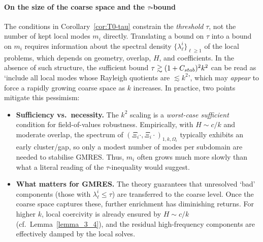\documentclass[preprint,3p,times]{elsarticle}
\newcommand{\Cstab}{C_{\textup{\textsf{stab}}}}
\theoremstyle{definition}
\numberwithin{equation}{section}
\begin{document}
\paragraph{On the size of the coarse space and the $\tau$-bound}
The conditions in Corollary~\ref{cor:T0-tau} constrain the \emph{threshold} $\tau$, not the number of kept local modes $m_i$ directly. 
Translating a bound on $\tau$ into a bound on $m_i$ requires information about the spectral density
$\{\lambda_\ell^i\}_{\ell\ge1}$ of the local problems, which depends on geometry, overlap, $H$, and coefficients. 
In the absence of such structure, the sufficient bound $\tau \gtrsim (1+\Cstab)^2 k^2$
can be read as `include all local modes whose Rayleigh quotients are $\lesssim k^2$', 
which may \emph{appear} to force a rapidly growing coarse space as $k$ increases.
In practice, two points mitigate this pessimism:
\begin{itemize}
\item
	\textbf{Sufficiency vs.\ necessity.} 
	The $k^2$ scaling is a \emph{worst-case sufficient} condition for field-of-values robustness. 
	Empirically, with $H\sim c/k$ and moderate overlap, the spectrum of $(\Xi_i\cdot,\Xi_i\cdot)_{1, k, \Omega_i}$ 
	typically exhibits an early cluster/gap, so only a modest number of modes per subdomain are needed to stabilise GMRES. 
	Thus, $m_i$ often grows much more slowly than what a literal reading of the $\tau$-inequality would suggest.
\item 
	\textbf{What matters for GMRES.} 
	The theory guarantees that unresolved `bad' components (those with $\lambda_\ell^i\le\tau$) 
	are transferred to the coarse level.  Once the coarse space captures these, further enrichment has diminishing returns. 
	For higher $k$, local coercivity is already ensured by $H\sim c/k$ (cf.\ Lemma~\ref{lemma_3_4}), 
	and the residual high-frequency components are effectively damped by the local solves.
\end{itemize}
\end{document}
